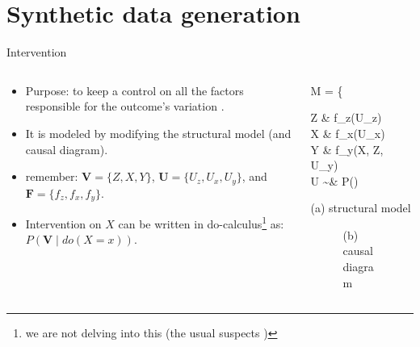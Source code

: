 \section{Synthetic data generation}
%
%
\begin{frame}[t, negative]
	\subsectionpage
\end{frame}
%
%
\begin{frame}
	{Intervention}
	\begin{columns}
		\begin{column}{0.5\textwidth}
			\begin{itemize}
				\item Purpose: to keep a control on all the factors responsible for the outcome's variation .
				\item It is modeled by modifying the structural model (and causal diagram).
				\item remember: $\pmb{V}=\{Z,X,Y\}$, $\pmb{U}=\{U_{z},U_{x},U_{y}\}$, and $\pmb{F}=\{f_{z},f_{x},f_{y}\}$.
				\item Intervention on $X$ can be written in do-calculus\footnote{we are not delving into this (the usual suspects \cite{Pearl_1988, Pearl_2009, Pearl_et_al_2016, Pearl_et_al_2018})} as: $P(\pmb{V} \; | \; do(X=x))$.
			\end{itemize}
		\end{column}
		\begin{column}{0.5\textwidth}  
			\begin{equ}
				M = \left\{ \begin{aligned} 
					Z \leftarrow & \; f_{z}(U_{z}) \\
					X \leftarrow & \; f_{x}(U_{x}) \\
					Y \leftarrow & \; f_{y}(X, Z, U_{y}) \\
					U \sim & \; P()
				\end{aligned} \right
				\caption*{(a) structural model}
			\end{equ}
			\begin{figure}
				\caption*{(b) causal diagram}
			\end{figure}
		\end{column}
	\end{columns}
\end{frame}
%
%
